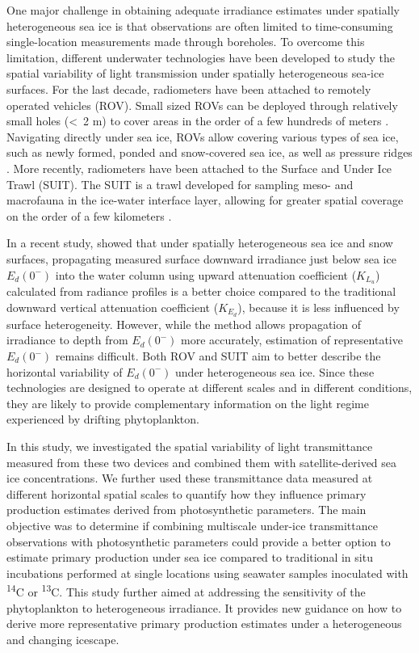 \documentclass[draft]{agujournal2018}
\newcommand{\ked}{\ensuremath{K_{E_d}}}
\newcommand{\klu}{\ensuremath{K_{L_u}}}
\newcommand{\edzerominus}{\ensuremath{{E_d(0^-)}}}
\begin{document}
One major challenge in obtaining adequate irradiance estimates under spatially heterogeneous sea ice is that observations are often limited to time-consuming single-location measurements made through boreholes. To overcome this limitation, different underwater technologies have been developed to study the spatial variability of light transmission under spatially heterogeneous sea-ice surfaces. For the last decade, radiometers have been attached to remotely operated vehicles (ROV). Small sized ROVs can be deployed through relatively small holes (\textless~2 m) to cover areas in the order of a few hundreds of meters \citep{Katlein2015, Katlein2017, Ambrose2005, Lund-Hansen2018, Nicolaus2010}. Navigating directly under sea ice, ROVs allow covering various types of sea ice, such as newly formed, ponded and snow-covered sea ice, as well as pressure ridges \citep{Katlein2017}. More recently, radiometers have been attached to the Surface and Under Ice Trawl (SUIT). The SUIT is a trawl developed for sampling meso- and macrofauna in the ice-water interface layer, allowing for greater spatial coverage on the order of a few kilometers \citep{Flores2012, Lange2016, Lange2017}.

In a recent study, \citet{Massicotte2018} showed that under spatially heterogeneous sea ice and snow surfaces, propagating measured surface downward irradiance just below sea ice \edzerominus{} into the water column using upward attenuation coefficient (\klu{}) calculated from radiance profiles is a better choice compared to the traditional downward vertical attenuation coefficient (\ked{}), because it is less influenced by surface heterogeneity. However, while the method allows propagation of irradiance to depth from \edzerominus{} more accurately, estimation of representative \edzerominus{} remains difficult. Both ROV and SUIT aim to better describe the horizontal variability of \edzerominus{} under heterogeneous sea ice. Since these technologies are designed to operate at different scales and in different conditions, they are likely to provide complementary information on the light regime experienced by drifting phytoplankton.

In this study, we investigated the spatial variability of light transmittance measured from these two devices and combined them with satellite-derived sea ice concentrations. We further used these transmittance data measured at different horizontal spatial scales to quantify how they influence primary production estimates derived from photosynthetic parameters. The main objective was to determine if combining multiscale under-ice transmittance observations with photosynthetic parameters could provide a better option to estimate primary production under sea ice compared to traditional in situ incubations performed at single locations using seawater samples inoculated with \textsuperscript{14}C or \textsuperscript{13}C.  This study further aimed at addressing the sensitivity of the phytoplankton to heterogeneous irradiance. It provides new guidance on how to derive more representative primary production estimates under a heterogeneous and changing icescape.
\end{document}
